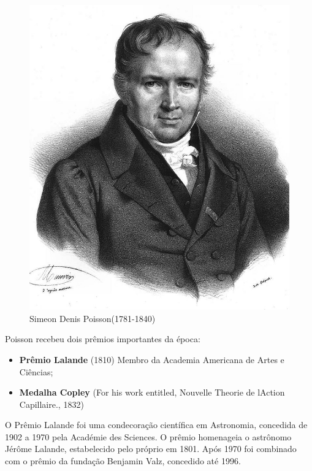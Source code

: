 \vspace{-1.69cm}
\begin{figure}
    \centering
\includegraphics[scale=0.2]{figures/Simeon_Poisson.jpeg}
    \caption{Simeon Denis Poisson(1781-1840)}
    \label{fig:my_label4}
\end{figure}


Poisson recebeu dois prêmios importantes da época:

\begin{itemize}
    \item \textbf{Prêmio Lalande} (1810) Membro da Academia Americana de Artes e Ciências;
    \item \textbf{Medalha Copley} (For his work entitled, Nouvelle Theorie de lAction Capillaire., 1832)
\end{itemize}

O Prêmio Lalande foi uma condecoração científica em Astronomia, concedida de 1902 a 1970 pela Académie des Sciences. O prêmio homenageia o astrônomo Jérôme Lalande, estabelecido pelo próprio em 1801. Após 1970 foi combinado com o prêmio da fundação Benjamin Valz, concedido até 1996.\vskip0.3cm


